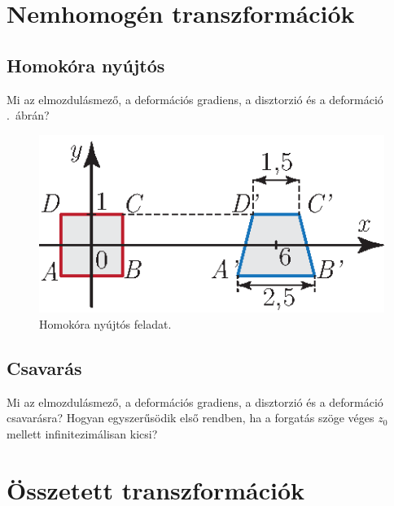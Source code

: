 \documentclass[12pt,a4paper]{scrartcl}
\begin{document}
\section{Nemhomogén transzformációk}
\subsection{Homokóra nyújtós}
Mi az elmozdulásmező, a deformációs gradiens, a disztorzió és a deformáció .\ ábrán?

\begin{figure}[htb] 
\centering    
\includegraphics[scale=1]{figs/homokora_nyujtas_feladat.eps}
\caption{Homokóra nyújtós feladat.}
\label{fig:homokora_nyujtas_feladat}
\end{figure}
\FloatBarrier

\subsection{Csavarás}
Mi az elmozdulásmező, a deformációs gradiens, a disztorzió és a deformáció csavarásra? Hogyan egyszerűsödik első rendben, ha a forgatás szöge véges $z_0$ mellett infinitezimálisan kicsi?

\section{Összetett transzformációk}
\end{document}
